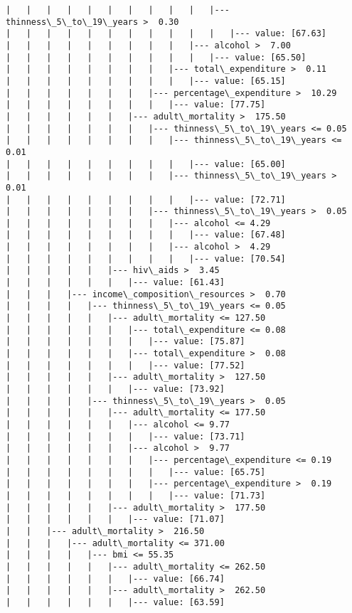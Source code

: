 \documentclass[11pt]{article}
\begin{document}
\begin{Verbatim}[commandchars=\\\{\}]
|   |   |   |   |   |   |   |   |   |   |--- thinness\_5\_to\_19\_years >  0.30
|   |   |   |   |   |   |   |   |   |   |   |--- value: [67.63]
|   |   |   |   |   |   |   |   |   |--- alcohol >  7.00
|   |   |   |   |   |   |   |   |   |   |--- value: [65.50]
|   |   |   |   |   |   |   |   |--- total\_expenditure >  0.11
|   |   |   |   |   |   |   |   |   |--- value: [65.15]
|   |   |   |   |   |   |   |--- percentage\_expenditure >  10.29
|   |   |   |   |   |   |   |   |--- value: [77.75]
|   |   |   |   |   |   |--- adult\_mortality >  175.50
|   |   |   |   |   |   |   |--- thinness\_5\_to\_19\_years <= 0.05
|   |   |   |   |   |   |   |   |--- thinness\_5\_to\_19\_years <= 0.01
|   |   |   |   |   |   |   |   |   |--- value: [65.00]
|   |   |   |   |   |   |   |   |--- thinness\_5\_to\_19\_years >  0.01
|   |   |   |   |   |   |   |   |   |--- value: [72.71]
|   |   |   |   |   |   |   |--- thinness\_5\_to\_19\_years >  0.05
|   |   |   |   |   |   |   |   |--- alcohol <= 4.29
|   |   |   |   |   |   |   |   |   |--- value: [67.48]
|   |   |   |   |   |   |   |   |--- alcohol >  4.29
|   |   |   |   |   |   |   |   |   |--- value: [70.54]
|   |   |   |   |   |--- hiv\_aids >  3.45
|   |   |   |   |   |   |--- value: [61.43]
|   |   |   |--- income\_composition\_resources >  0.70
|   |   |   |   |--- thinness\_5\_to\_19\_years <= 0.05
|   |   |   |   |   |--- adult\_mortality <= 127.50
|   |   |   |   |   |   |--- total\_expenditure <= 0.08
|   |   |   |   |   |   |   |--- value: [75.87]
|   |   |   |   |   |   |--- total\_expenditure >  0.08
|   |   |   |   |   |   |   |--- value: [77.52]
|   |   |   |   |   |--- adult\_mortality >  127.50
|   |   |   |   |   |   |--- value: [73.92]
|   |   |   |   |--- thinness\_5\_to\_19\_years >  0.05
|   |   |   |   |   |--- adult\_mortality <= 177.50
|   |   |   |   |   |   |--- alcohol <= 9.77
|   |   |   |   |   |   |   |--- value: [73.71]
|   |   |   |   |   |   |--- alcohol >  9.77
|   |   |   |   |   |   |   |--- percentage\_expenditure <= 0.19
|   |   |   |   |   |   |   |   |--- value: [65.75]
|   |   |   |   |   |   |   |--- percentage\_expenditure >  0.19
|   |   |   |   |   |   |   |   |--- value: [71.73]
|   |   |   |   |   |--- adult\_mortality >  177.50
|   |   |   |   |   |   |--- value: [71.07]
|   |   |--- adult\_mortality >  216.50
|   |   |   |--- adult\_mortality <= 371.00
|   |   |   |   |--- bmi <= 55.35
|   |   |   |   |   |--- adult\_mortality <= 262.50
|   |   |   |   |   |   |--- value: [66.74]
|   |   |   |   |   |--- adult\_mortality >  262.50
|   |   |   |   |   |   |--- value: [63.59]

\end{Verbatim}
\end{document}
